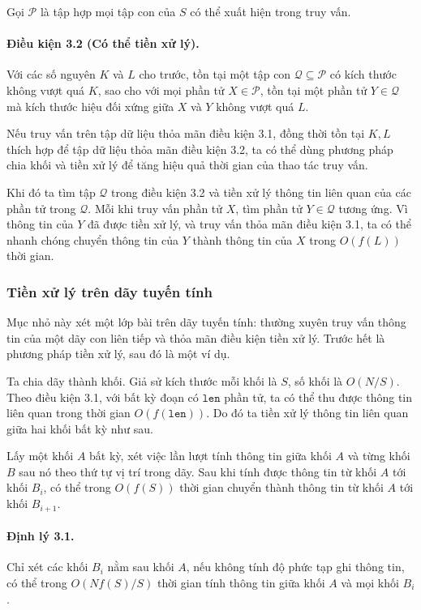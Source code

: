 \documentclass[11pt]{article}
\begin{document}
Gọi \(\mathcal{P}\) là tập hợp mọi tập con của \(S\) có thể xuất hiện trong
truy vấn.

\paragraph{Điều kiện 3.2 (Có thể tiền xử lý).}
Với các số nguyên \(K\) và \(L\) cho trước, tồn tại một tập con
\(\mathcal{Q}\subseteq \mathcal{P}\) có kích thước không vượt quá \(K\), sao
cho với mọi phần tử \(X\in\mathcal{P}\), tồn tại một phần tử
\(Y\in\mathcal{Q}\) mà kích thước hiệu đối xứng giữa \(X\) và \(Y\) không
vượt quá \(L\).

Nếu truy vấn trên tập dữ liệu thỏa mãn điều kiện 3.1, đồng thời tồn tại
\(K,L\) thích hợp để tập dữ liệu thỏa mãn điều kiện 3.2, ta có thể dùng
phương pháp chia khối và tiền xử lý để tăng hiệu quả thời gian của thao tác
truy vấn.

Khi đó ta tìm tập \(\mathcal{Q}\) trong điều kiện 3.2 và tiền xử lý thông tin
liên quan của các phần tử trong \(\mathcal{Q}\). Mỗi khi truy vấn phần tử
\(X\), tìm phần tử \(Y\in\mathcal{Q}\) tương ứng. Vì thông tin của \(Y\) đã
được tiền xử lý, và truy vấn thỏa mãn điều kiện 3.1, ta có thể nhanh chóng
chuyển thông tin của \(Y\) thành thông tin của \(X\) trong
\(O(f(L))\) thời gian.

\subsubsection{Tiền xử lý trên dãy tuyến tính}

Mục nhỏ này xét một lớp bài trên dãy tuyến tính: thường xuyên truy vấn thông
tin của một dãy con liên tiếp và thỏa mãn điều kiện tiền xử lý. Trước hết là
phương pháp tiền xử lý, sau đó là một ví dụ.

Ta chia dãy thành khối. Giả sử kích thước mỗi khối là \(S\), số khối là
\(O(N/S)\). Theo điều kiện 3.1, với bất kỳ đoạn có \(\texttt{len}\) phần tử,
ta có thể thu được thông tin liên quan trong thời gian
\(O(f(\texttt{len}))\). Do đó ta tiền xử lý thông tin liên quan giữa hai khối
bất kỳ như sau.

Lấy một khối \(A\) bất kỳ, xét việc lần lượt tính thông tin giữa khối \(A\)
và từng khối \(B\) sau nó theo thứ tự vị trí trong dãy. Sau khi tính được
thông tin từ khối \(A\) tới khối \(B_i\), có thể trong \(O(f(S))\) thời gian
chuyển thành thông tin từ khối \(A\) tới khối \(B_{i+1}\).

\paragraph{Định lý 3.1.}
Chỉ xét các khối \(B_i\) nằm sau khối \(A\), nếu không tính độ phức tạp ghi
thông tin, có thể trong \(O(Nf(S)/S)\) thời gian tính thông tin giữa khối
\(A\) và mọi khối \(B_i\).
\end{document}
